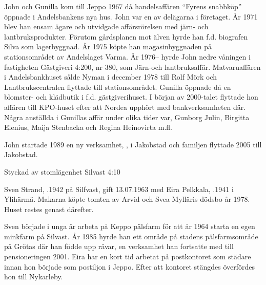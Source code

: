 John och Gunilla kom till Jeppo 1967 då handelsaffären ``Fyrens snabbköp'' öppnade i Andelsbankens nya hus. John var en av delägarna i företaget. År 1971 blev han ensam ägare och utvidgade affärsrörelsen med järn- och lantbruksprodukter. Förutom gårdsplanen mot älven hyrde han f.d. biografen Silva som lagerbyggnad. År 1975 köpte han magasinbyggnaden på stationsområdet av Andelslaget Varma. År 1976-- hyrde John nedre våningen i fastigheten Gästgiveri 4:200, nr 380, som Järn-och lantbruksaffär. Matvaruaffären i Andelsbankhuset sålde Nyman i december 1978 till Rolf Mörk och Lantbrukscentralen flyttade till stationsområdet. Gunilla öppnade då en blomster- och klädbutik i f.d. gästgiverihuset. I början av 2000-talet flyttade hon affären till KPO-huset efter att Nordea upphört med bankverksamheten där. Några anställda i Gunillas affär under olika tider var, Gunborg Julin, Birgitta Elenius, Maija Stenbacka och Regina Heinovirta m.fl.

John startade 1989 en ny verksamhet, , i Jakobstad och familjen flyttade 2005 till Jakobstad.




Styckad av stomlägenhet Silvast 4:10


Sven Strand, .1942 på Silfvast, gift 13.07.1963 med Eira Pelkkala, .1941 i Ylihärmä. Makarna köpte tomten av Arvid och Svea Mylläris dödsbo år 1978. Huset restes genast därefter.

Sven började i unga år arbeta på Keppo pälsfarm för att år 1964 starta en egen minkfarm på Silvast. År 1985 hyrde han ett område på stadens pälsfarmsområde på Grötas där han födde upp rävar, en verksamhet han fortsatte med till pensioneringen 2001. Eira har en kort tid arbetat på postkontoret som städare innan hon började som postiljon i Jeppo. Efter att kontoret stängdes överfördes hon till Nykarleby.
\begin{jhchildren}
  \item {}
  \item {}
\end{jhchildren}





